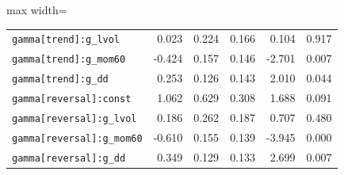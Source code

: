 \begin{table}[!htbp]
\begin{adjustbox}{max width=\textwidth}
\begin{tabular}{lrrrrr}
\texttt{gamma[trend]:g\_lvol} & 0.023 & 0.224 & 0.166 & 0.104 & 0.917\\
\texttt{gamma[trend]:g\_mom60} & -0.424 & 0.157 & 0.146 & -2.701 & 0.007\\
\texttt{gamma[trend]:g\_dd} & 0.253 & 0.126 & 0.143 & 2.010 & 0.044\\
\texttt{gamma[reversal]:const} & 1.062 & 0.629 & 0.308 & 1.688 & 0.091\\
\texttt{gamma[reversal]:g\_lvol} & 0.186 & 0.262 & 0.187 & 0.707 & 0.480\\
\texttt{gamma[reversal]:g\_mom60} & -0.610 & 0.155 & 0.139 & -3.945 & 0.000\\
\texttt{gamma[reversal]:g\_dd} & 0.349 & 0.129 & 0.133 & 2.699 & 0.007\\
\bottomrule
\end{tabular}
\end{adjustbox}
\end{table}